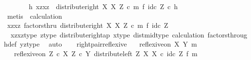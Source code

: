 \begin{isabellebody}
\ \ \ \ \isamarkupfalse%
\ \isamarkupfalse%
\ {\isachardoublequoteopen}{\isasymexists}h{\isachardot}{\kern0pt}\ {\isasymlangle}{\isasymlangle}x{\isacharcomma}{\kern0pt}z{\isasymrangle}{\isacharcomma}{\kern0pt}{\isasymlangle}x{\isacharcomma}{\kern0pt}z{\isasymrangle}{\isasymrangle}\ {\isacharequal}{\kern0pt}\ {\isacharparenleft}{\kern0pt}distribute{\isacharunderscore}{\kern0pt}right\ X\ X\ Z\ {\isasymcirc}\isactrlsub c\ m\ {\isasymtimes}\isactrlsub f\ id\isactrlsub c\ Z{\isacharparenright}{\kern0pt}\ {\isasymcirc}\isactrlsub c\ h{\isachardoublequoteclose}\isanewline
\ \ \ \ \ \ \isamarkupfalse%
\ {\isacharparenleft}{\kern0pt}metis\ \ calculation{\isacharparenright}{\kern0pt}\isanewline
\ \ \ \ \isamarkupfalse%
\ \isamarkupfalse%
\ {\isachardoublequoteopen}{\isasymlangle}{\isasymlangle}x{\isacharcomma}{\kern0pt}z{\isasymrangle}{\isacharcomma}{\kern0pt}{\isasymlangle}x{\isacharcomma}{\kern0pt}z{\isasymrangle}{\isasymrangle}\ factorsthru\ {\isacharparenleft}{\kern0pt}distribute{\isacharunderscore}{\kern0pt}right\ X\ X\ Z\ {\isasymcirc}\isactrlsub c\ m\ {\isasymtimes}\isactrlsub f\ id\isactrlsub c\ Z{\isacharparenright}{\kern0pt}{\isachardoublequoteclose}\isanewline
\ \ \ \ \ \ \isamarkupfalse%
\ \ xzxz{\isacharunderscore}{\kern0pt}type\ z{\isacharunderscore}{\kern0pt}type\ distribute{\isacharunderscore}{\kern0pt}right{\isacharunderscore}{\kern0pt}ap\ x{\isacharunderscore}{\kern0pt}type\ dist{\isacharunderscore}{\kern0pt}mid{\isacharunderscore}{\kern0pt}type\ calculation\ factors{\isacharunderscore}{\kern0pt}through{\isacharunderscore}{\kern0pt}def{}\ yz{\isacharunderscore}{\kern0pt}type\ \isamarkupfalse%
\ auto\isanewline
\ \ \isamarkupfalse%
\isanewline
{}\isamarkupfalse%
%
\endisatagproof
{\isafoldproof}%
%
\isadelimproof
\isanewline
%
\endisadelimproof
\isanewline
{}\isamarkupfalse%
\ right{\isacharunderscore}{\kern0pt}pair{\isacharunderscore}{\kern0pt}reflexive{\isacharcolon}{\kern0pt}\isanewline
\ \ \ {\isachardoublequoteopen}reflexive{\isacharunderscore}{\kern0pt}on\ X\ {\isacharparenleft}{\kern0pt}Y{\isacharcomma}{\kern0pt}\ m{\isacharparenright}{\kern0pt}{\isachardoublequoteclose}\isanewline
\ \ \ {\isachardoublequoteopen}reflexive{\isacharunderscore}{\kern0pt}on\ {\isacharparenleft}{\kern0pt}Z\ {\isasymtimes}\isactrlsub c\ X{\isacharparenright}{\kern0pt}\ {\isacharparenleft}{\kern0pt}Z\ {\isasymtimes}\isactrlsub c\ Y{\isacharcomma}{\kern0pt}\ distribute{\isacharunderscore}{\kern0pt}left\ Z\ X\ X\ {\isasymcirc}\isactrlsub c\ {\isacharparenleft}{\kern0pt}id\isactrlsub c\ Z\ {\isasymtimes}\isactrlsub f\ m{\isacharparenright}{\kern0pt}{\isacharparenright}{\kern0pt}{\isachardoublequoteclose}\isanewline

\end{isabellebody}
